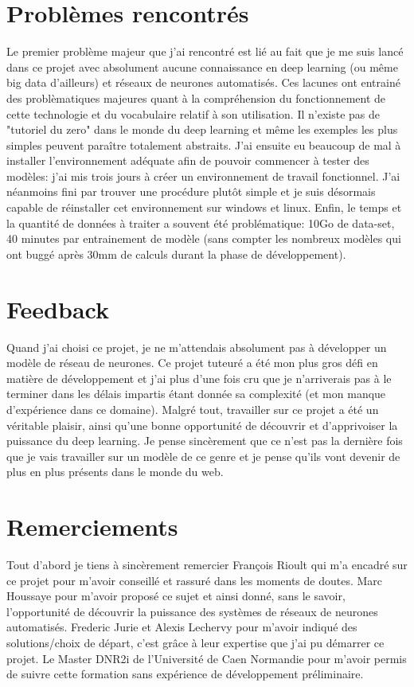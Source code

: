 \documentclass[a4paper,12pt]{report}
\begin{document}
    \section{Problèmes rencontrés}
    Le premier problème majeur que j'ai rencontré est lié au fait que je me suis lancé dans ce projet avec absolument aucune connaissance en deep learning (ou même big data d'ailleurs) et réseaux de neurones automatisés. Ces lacunes ont entrainé des problèmatiques majeures quant à la compréhension du fonctionnement de cette technologie et du vocabulaire relatif à son utilisation. Il n'existe pas de "tutoriel du zero" dans le monde du deep learning et même les exemples les plus simples peuvent paraître totalement abstraits.
    \medbreak
    J'ai ensuite eu beaucoup de mal à installer l'environnement adéquate afin de pouvoir commencer à tester des modèles: j'ai mis trois jours à créer un environnement de travail fonctionnel. J'ai néanmoins fini par trouver une procédure plutôt simple et je suis désormais capable de réinstaller cet environnement sur windows et linux.
    \medbreak
    Enfin, le temps et la quantité de données à traiter a souvent été problématique: 10Go de data-set, 40 minutes par entrainement de modèle (sans compter les nombreux modèles qui ont buggé après 30mm de calculs durant la phase de développement).

    \section{Feedback}
    Quand j'ai choisi ce projet, je ne m'attendais absolument pas à développer un modèle de réseau de neurones. Ce projet tuteuré a été mon plus gros défi en matière de développement et j'ai plus d'une fois cru que je n'arriverais pas à le terminer dans les délais impartis étant donnée sa complexité (et mon manque d'expérience dans ce domaine).
    \medbreak
    Malgré tout, travailler sur ce projet a été un véritable plaisir, ainsi qu'une bonne opportunité de découvrir et d'apprivoiser la puissance du deep learning. Je pense sincèrement que ce n'est pas la dernière fois que je vais travailler sur un modèle de ce genre et je pense qu'ils vont devenir de plus en plus présents dans le monde du web.    

    \section{Remerciements}
    Tout d'abord je tiens à sincèrement remercier François Rioult qui m'a encadré sur ce projet pour m'avoir conseillé et rassuré dans les moments de doutes.
    \medbreak
    Marc Houssaye pour m'avoir proposé ce sujet et ainsi donné, sans le savoir, l'opportunité de découvrir la puissance des systèmes de réseaux de neurones automatisés.
    \medbreak
    Frederic Jurie et Alexis Lechervy pour m'avoir indiqué des solutions/choix de départ, c'est grâce à leur expertise que j'ai pu démarrer ce projet.
    \medbreak
    Le Master DNR2i de l'Université de Caen Normandie pour m'avoir permis de suivre cette formation sans expérience de développement préliminaire.
    
\end{document}
